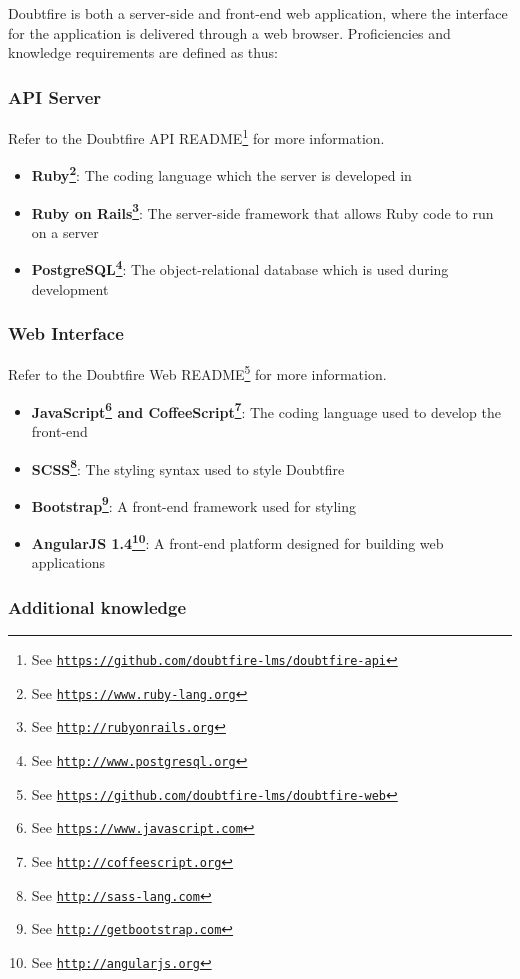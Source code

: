 \documentclass[a4paper,12pt]{article}
\renewcommand{\href}[2]{#2\footnote{See \texttt{\url{#1}}}}
\providecommand{\tightlist}{%
  \setlength{\itemsep}{0pt}\setlength{\parskip}{0pt}}
\begin{document}
Doubtfire is both a server-side and front-end web application, where the
interface for the application is delivered through a web browser.
Proficiencies and knowledge requirements are defined as thus:

\subsubsection{API Server}\label{api-server}

Refer to the Doubtfire API
\href{https://github.com/doubtfire-lms/doubtfire-api}{README} for more
information.

\begin{itemize}
\tightlist
\item
  \textbf{\href{https://www.ruby-lang.org}{Ruby}}: The coding language
  which the server is developed in
\item
  \textbf{\href{http://rubyonrails.org}{Ruby on Rails}}: The server-side
  framework that allows Ruby code to run on a server
\item
  \textbf{\href{http://www.postgresql.org}{PostgreSQL}}: The
  object-relational database which is used during development
\end{itemize}

\subsubsection{Web Interface}\label{web-interface}

Refer to the Doubtfire Web
\href{https://github.com/doubtfire-lms/doubtfire-web}{README} for more
information.

\begin{itemize}
\tightlist
\item
  \textbf{\href{https://www.javascript.com}{JavaScript} and
  \href{http://coffeescript.org}{CoffeeScript}}: The coding language
  used to develop the front-end
\item
  \textbf{\href{http://sass-lang.com}{SCSS}}: The styling syntax used to
  style Doubtfire
\item
  \textbf{\href{http://getbootstrap.com}{Bootstrap}}: A front-end
  framework used for styling
\item
  \textbf{\href{http://angularjs.org}{AngularJS 1.4}}: A front-end
  platform designed for building web applications
\end{itemize}

\subsubsection{Additional knowledge}\label{additional-knowledge}
\end{document}
